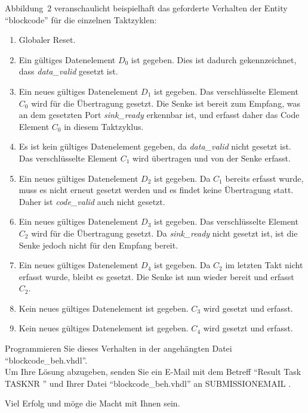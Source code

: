 \documentclass[a4paper,12pt]{article}
\begin{document}
Abbildung~2 veranschaulicht beispielhaft das geforderte Verhalten der Entity "`blockcode"' f\"ur die einzelnen Taktzyklen:
\begin{enumerate}
\item Globaler Reset.
\item Ein g\"ultiges Datenelement $D_0$ ist gegeben. Dies ist dadurch gekennzeichnet, dass \textit{data\_valid} gesetzt ist.
\item Ein neues g\"ultiges Datenelement $D_1$ ist gegeben. Das verschl\"usselte Element $C_0$ wird f\"ur die \"Ubertragung gesetzt. Die Senke ist bereit zum Empfang, was an dem gesetzten Port \textit{sink\_ready} erkennbar ist, und erfasst daher das Code Element $C_0$ in diesem Taktzyklus.
\item Es ist kein g\"ultiges Datenelement gegeben, da \textit{data\_valid} nicht gesetzt ist. Das verschl\"usselte Element $C_1$ wird \"ubertragen und von der Senke erfasst.
\item Ein neues g\"ultiges Datenelement $D_2$ ist gegeben. Da $C_1$ bereits erfasst wurde, muss es nicht erneut gesetzt werden und es findet keine \"Ubertragung statt. Daher ist \textit{code\_valid} auch nicht gesetzt.
\item Ein neues g\"ultiges Datenelement $D_3$ ist gegeben. Das verschl\"usselte Element $C_2$ wird f\"ur die \"Ubertragung gesetzt. Da \textit{sink\_ready} nicht gesetzt ist, ist die Senke jedoch nicht f\"ur den Empfang bereit.
\item Ein neues g\"ultiges Datenelement $D_4$ ist gegeben. Da $C_2$ im letzten Takt nicht erfasst wurde, bleibt es gesetzt. Die Senke ist nun wieder bereit und erfasst $C_2$.
\item Kein neues g\"ultiges Datenelement ist gegeben. $C_3$ wird gesetzt und erfasst.
\item Kein neues g\"ultiges Datenelement ist gegeben. $C_4$ wird gesetzt und erfasst.
\end{enumerate}

\vspace{0.7cm}

Programmieren Sie dieses Verhalten in der angeh\"angten Datei "`blockcode\_beh.vhdl"'.\\

Um Ihre L\"osung abzugeben, senden Sie ein E-Mail mit dem Betreff "`Result Task {{ TASKNR }}"' und Ihrer Datei "`blockcode\_beh.vhdl"'  an {{ SUBMISSIONEMAIL }}.

\vspace{0.7cm}

Viel Erfolg und m\"oge die Macht mit Ihnen sein.
\end{document}

